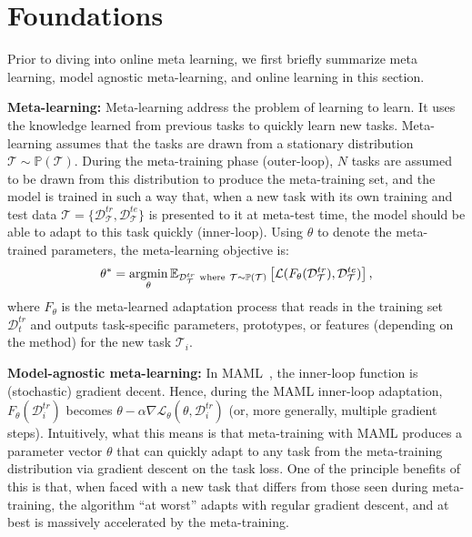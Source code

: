 \section{Foundations}

Prior to diving into online meta learning, we first briefly summarize meta learning, model agnostic meta-learning, and online learning in this section. 

\noindent \textbf{Meta-learning:} Meta-learning address the problem of learning to learn. It uses the knowledge learned from previous tasks to quickly learn new tasks. Meta-learning assumes that the tasks are drawn from a stationary distribution $\mathcal{T}\sim \mathbb{P}(\mathcal{T})$. During the meta-training phase (outer-loop), $N$ tasks are assumed to be drawn from this distribution to produce the meta-training set, and the model is trained in such a way that, when a new task with its own training and test data $\mathcal{T}=\{\mathcal{D}^{tr}_{\mathcal{T}}, \mathcal{D}^{te}_{\mathcal{T}}\}$ is presented to it at meta-test time, the model should be able to adapt to this task quickly (inner-loop). Using $\theta$ to denote the meta-trained parameters, the meta-learning objective is:
\begin{equation}
    \theta^* = \operatorname*{argmin}_{\theta} \mathbb{E}_{\mathcal{D}^{tr}_{\mathcal{T}} \ \text{where} \ \mathcal{T} \sim \mathbb{P}(\mathcal{T})}\left[\mathcal{L}(F_{\theta}(\mathcal{D}^{tr}_\mathcal{T}), \mathcal{D}^{te}_\mathcal{T})\right],
\end{equation}
where $F_{\theta}$ is the meta-learned adaptation process that reads in the training set $\mathcal{D}^{tr}_t$ and outputs task-specific parameters, prototypes, or features (depending on the method) for the new task $\mathcal{T}_i$.

\noindent \textbf{Model-agnostic meta-learning:} In MAML~\citep{finn2017model}, the inner-loop function is (stochastic) gradient decent. Hence, during the MAML inner-loop adaptation, $F_{\theta}(\mathcal{D}^{tr}_i)$ becomes $\theta - \alpha \nabla \mathcal{L}_\theta(\theta, \mathcal{D}^{tr}_i)$ (or, more generally, multiple gradient steps). Intuitively, what this means is that meta-training with MAML produces a parameter vector $\theta$ that can quickly adapt to any task from the meta-training distribution via gradient descent on the task loss. One of the principle benefits of this is that, when faced with a new task that differs from those seen during meta-training, the algorithm ``at worst'' adapts with regular gradient descent, and at best is massively accelerated by the meta-training.


